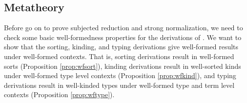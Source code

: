 \subsection{Metatheory}

Before go on to prove subjected reduction and strong normalization, we need to
check some basic well-formedness properties for the derivations of \Fi.
We want to show that the sorting, kinding, and typing derivations give
well-formed results under well-formed contexts. That is, sorting derivations
result in well-formed sorts (Proposition \ref{prop:wfsort}),
kinding derivations result in well-sorted kinds under well-formed
type level contexts (Proposition \ref{prop:wfkind}), and typing derivations
result in well-kinded types under well-formed type and term level contexts
(Proposition \ref{prop:wftype}).

